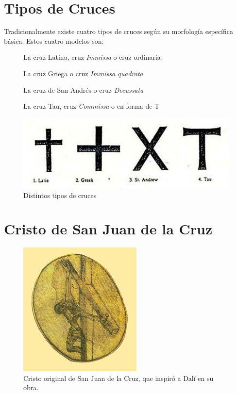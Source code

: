\section{Tipos de Cruces} \label{app:crosses}

Tradicionalmente existe cuatro tipos de cruces según su morfología específica básica. Estos cuatro modelos son:

\begin{description}
\item[] La cruz Latina, cruz \textit{Immissa} o cruz ordinaria
\item[] La cruz Griega o cruz \textit{Immissa quadrata}
\item[] La cruz de San Andrés o cruz \textit{Decussata}
\item[] La cruz Tau, cruz \textit{Commissa} o en forma de T
\end{description}


\begin{figure}[H]
    \centering
    \includegraphics[width=1\textwidth]{cruces.jpg}
    \caption{Distintos tipos de cruces} %
\end{figure}

\section{Cristo de San Juan de la Cruz} \label{app:sanjuan}

\begin{figure}[H]
    \centering
    \includegraphics[width=0.55\textwidth]{sanju.jpg}
    \caption{Cristo original de San Juan de la Cruz, que inspiró a Dalí en su obra.} %
\end{figure}